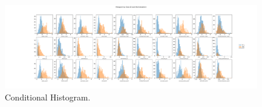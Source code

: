 \documentclass[conference]{IEEEtran}
\begin{document}
\begin{figure}[htpb!]
    \centerline{\includegraphics[width=1.2 \textwidth]{../../code/hw1/figures/3-1-conditional-histogram.pdf}}
    \caption{Conditional Histogram.}
    \label{fig:3-1-conditional-histogram}
\end{figure}



\end{document}
